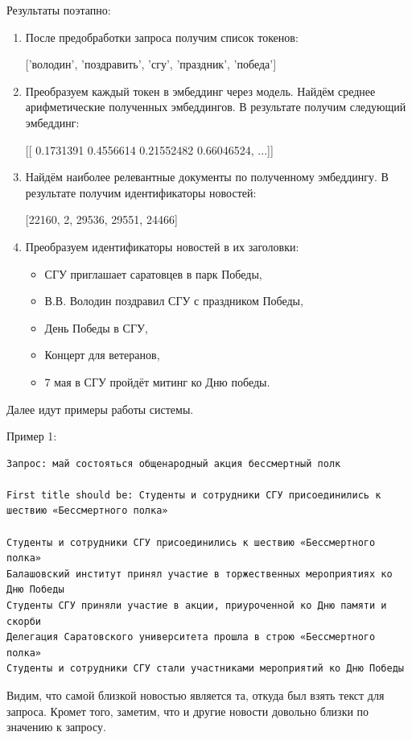 \documentclass[coursework]{SCWorks}
\begin{document}
Результаты поэтапно:
\begin{enumerate}
    \item После предобработки запроса получим список токенов:
    
    ['володин', 'поздравить', 'сгу', 'праздник', 'победа']
    \item Преобразуем каждый токен в эмбеддинг через модель. Найдём среднее арифметические полученных эмбеддингов. В результате получим следующий эмбеддинг: 
    
    [[ 0.1731391   0.4556614   0.21552482  0.66046524, ...]]
    \item Найдём наиболее релевантные документы по полученному эмбеддингу. В результате получим идентификаторы новостей: 
    
    [22160, 2, 29536, 29551, 24466]
    \item Преобразуем идентификаторы новостей в их заголовки:
    \begin{itemize}
        \item СГУ приглашает саратовцев в парк Победы, 
        \item В.В. Володин поздравил СГУ с праздником Победы, 
        \item День Победы в СГУ, 
        \item Концерт для ветеранов, 
        \item 7 мая в СГУ пройдёт митинг ко Дню победы.
    \end{itemize}
\end{enumerate}

Далее идут примеры работы системы.

Пример 1:
\begin{verbatim}
Запрос: май состояться общенародный акция бессмертный полк

First title should be: Студенты и сотрудники СГУ присоединились к шествию «Бессмертного полка»

Студенты и сотрудники СГУ присоединились к шествию «Бессмертного полка»
Балашовский институт принял участие в торжественных мероприятиях ко Дню Победы
Студенты СГУ приняли участие в акции, приуроченной ко Дню памяти и скорби
Делегация Саратовского университета прошла в строю «Бессмертного полка»
Студенты и сотрудники СГУ стали участниками мероприятий ко Дню Победы
\end{verbatim}

Видим, что самой близкой новостью является та, откуда был взять текст для запроса. Кромет того, заметим, что и другие новости довольно близки по значению к запросу.
\end{document}
